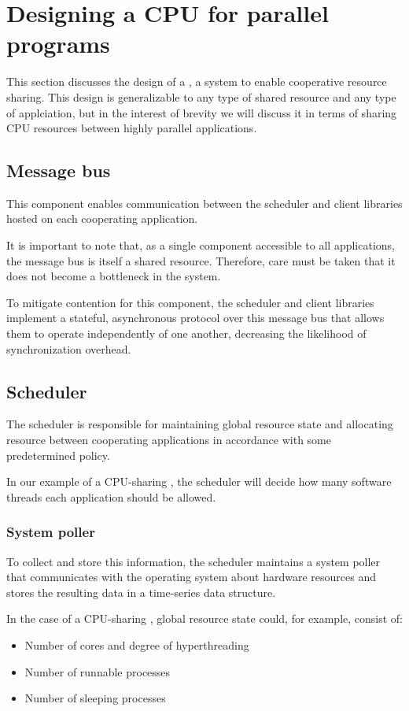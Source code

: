 \section{Designing a CPU \mechfull{} for parallel programs}
This section discusses the design of a \mechfull{}, a system to enable cooperative resource sharing. This design is generalizable to any type of shared resource and any type of applciation, but in the interest of brevity we will discuss it in terms of sharing CPU resources between highly parallel applications.

\subsection{Message bus}
This component enables communication between the scheduler and client libraries hosted on each cooperating application.

It is important to note that, as a single component accessible to all applications, the message bus is itself a shared resource. Therefore, care must be taken that it does not become a bottleneck in the system.

To mitigate contention for this component, the scheduler and client libraries implement a stateful, asynchronous protocol over this message bus that allows them to operate independently of one another, decreasing the likelihood of synchronization overhead.
\subsection{Scheduler}
The scheduler is responsible for maintaining global resource state and allocating resource between cooperating applications in accordance with some predetermined policy.

In our example of a CPU-sharing \mech{}, the scheduler will decide how many software threads each application should be allowed.

\subsubsection{System poller}
To collect and store this information, the scheduler maintains a system poller that communicates with the operating system about hardware resources and stores the resulting data in a time-series data structure.

In the case of a CPU-sharing \mech, global resource state could, for example, consist of:
\begin{itemize}
    \item Number of cores and degree of hyperthreading
    \item Number of runnable processes
    \item Number of sleeping processes
\end{itemize}

